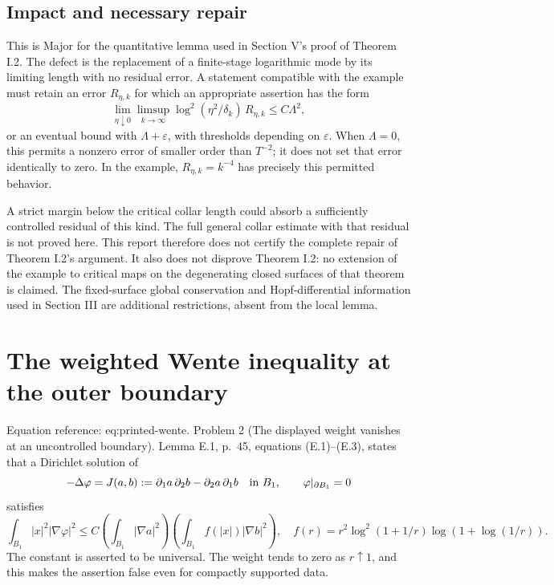 \documentclass[10pt]{article}
\begin{document}
\subsection*{Impact and necessary repair}
This is Major for the quantitative lemma used in Section V’s proof of Theorem I.2. The defect is the replacement of a finite-stage logarithmic mode by its limiting length with no residual error. A statement compatible with the example must retain an error \(R_{\eta,k}\) for which an appropriate assertion has the form \[\lim_{\eta\downarrow0}\limsup_{k\to\infty}
 \log^2(\eta^2/\delta_k)\,R_{\eta,k}\le C\Lambda^2,\] or an eventual bound with \(\Lambda+\varepsilon\), with thresholds depending on \(\varepsilon\). When \(\Lambda=0\), this permits a nonzero error of smaller order than \(T^{-2}\); it does not set that error identically to zero. In the example, \(R_{\eta,k}=k^{-4}\) has precisely this permitted behavior.\par
A strict margin below the critical collar length could absorb a sufficiently controlled residual of this kind. The full general collar estimate with that residual is not proved here. This report therefore does not certify the complete repair of Theorem I.2’s argument. It also does not disprove Theorem I.2: no extension of the example to critical maps on the degenerating closed surfaces of that theorem is claimed. The fixed-surface global conservation and Hopf-differential information used in Section III are additional restrictions, absent from the local lemma.\par
\section*{The weighted Wente inequality at the outer boundary}
Equation reference: eq:printed-wente. Problem 2 (The displayed weight vanishes at an uncontrolled boundary).  Lemma E.1, p. 45, equations (E.1)–(E.3), states that a Dirichlet solution of \[-\Delta\varphi=J(a,b):=\partial_1a\,\partial_2b
                         -\partial_2a\,\partial_1b
 \quad\hbox{in }B_1,\qquad \varphi|_{\partial B_1}=0\] satisfies \[
 \int_{B_1}|x|^2|\nabla\varphi|^2
 \le C\left(\int_{B_1}|\nabla a|^2\right)
       \left(\int_{B_1}f(|x|)|\nabla b|^2\right),
 \quad
 f(r)=r^2\log^2(1+1/r)\log(1+\log(1/r)).\] The constant is asserted to be universal. The weight tends to zero as \(r\uparrow1\), and this makes the assertion false even for compactly supported data.\par
\end{document}
